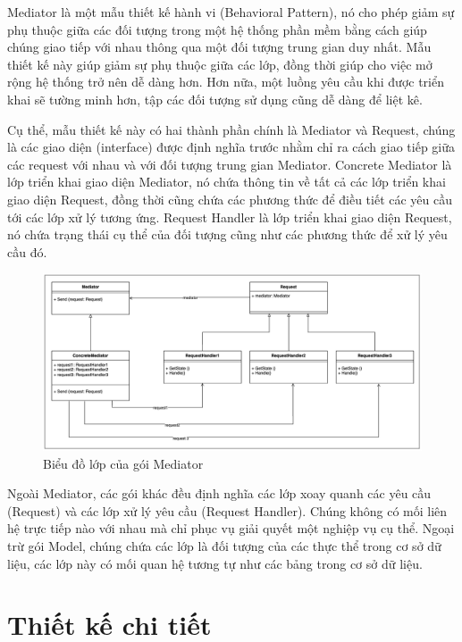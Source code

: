 \documentclass[../DoAn.tex]{subfiles}
\begin{document}
\newpage

Mediator là một mẫu thiết kế hành vi (Behavioral Pattern), nó cho phép giảm sự phụ thuộc giữa các đối tượng trong một hệ thống phần mềm bằng cách
giúp chúng giao tiếp với nhau thông qua một đối tượng trung gian duy nhất. Mẫu thiết kế này giúp giảm sự phụ thuộc giữa các lớp, đồng thời giúp cho việc
mở rộng hệ thống trở nên dễ dàng hơn. Hơn nữa, một luồng yêu cầu khi được triển khai sẽ tường minh hơn, tập các đối tượng sử dụng cũng dễ dàng để liệt kê.

Cụ thể, mẫu thiết kế này có hai thành phần chính là Mediator và Request, chúng là các giao diện (interface) được định nghĩa trước nhằm chỉ ra cách
giao tiếp giữa các request với nhau và với đối tượng trung gian Mediator. Concrete Mediator là lớp triển khai giao diện Mediator, nó chứa thông tin về tất cả
các lớp triển khai giao diện Request, đồng thời cũng chứa các phương thức để điều tiết các yêu cầu tới các lớp xử lý tương ứng. Request Handler là lớp triển khai
giao diện Request, nó chứa trạng thái cụ thể của đối tượng cũng như các phương thức để xử lý yêu cầu đó.

\begin{figure}[H]
    \centering
    \includegraphics[width=1.0\linewidth]{Hinhve/ClassDiagram_Mediator.png}
    \caption{Biểu đồ lớp của gói Mediator}
    \label{fig:ClassDiagram_Mediator}
\end{figure}

Ngoài Mediator, các gói khác đều định nghĩa các lớp xoay quanh các yêu cầu (Request) và các lớp xử lý yêu cầu (Request Handler). Chúng không có mối liên hệ trực tiếp
nào với nhau mà chỉ phục vụ giải quyết một nghiệp vụ cụ thể. Ngoại trừ gói Model, chúng chứa các lớp là đối tượng của các thực thể trong cơ sở dữ liệu, các lớp này
có mối quan hệ tương tự như các bảng trong cơ sở dữ liệu.

\newpage


\section{Thiết kế chi tiết}
\label{section:4.2}
\end{document}
